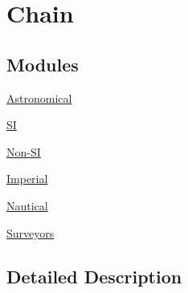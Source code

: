 \hypertarget{group___e_g_x_math-_conversions-_length_conversions-_surveyors-_chain}{}\section{Chain}
\label{group___e_g_x_math-_conversions-_length_conversions-_surveyors-_chain}
\subsection*{Modules}
\begin{DoxyCompactItemize}
\item 
\mbox{\hyperlink{group___e_g_x_math-_conversions-_length_conversions-_surveyors-_chain-_astronomical}{Astronomical}}
\item 
\mbox{\hyperlink{group___e_g_x_math-_conversions-_length_conversions-_surveyors-_chain-_s_i}{SI}}
\item 
\mbox{\hyperlink{group___e_g_x_math-_conversions-_length_conversions-_surveyors-_chain-_non-_s_i}{Non-\/\+SI}}
\item 
\mbox{\hyperlink{group___e_g_x_math-_conversions-_length_conversions-_surveyors-_chain-_imperial}{Imperial}}
\item 
\mbox{\hyperlink{group___e_g_x_math-_conversions-_length_conversions-_surveyors-_chain-_nautical}{Nautical}}
\item 
\mbox{\hyperlink{group___e_g_x_math-_conversions-_length_conversions-_surveyors-_chain-_surveyors}{Surveyors}}
\end{DoxyCompactItemize}


\subsection{Detailed Description}
